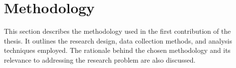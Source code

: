 \section{Methodology}

This section describes the methodology used in the first contribution of the thesis. It outlines the research design, data collection methods, and analysis techniques employed. The rationale behind the chosen methodology and its relevance to addressing the research problem are also discussed.